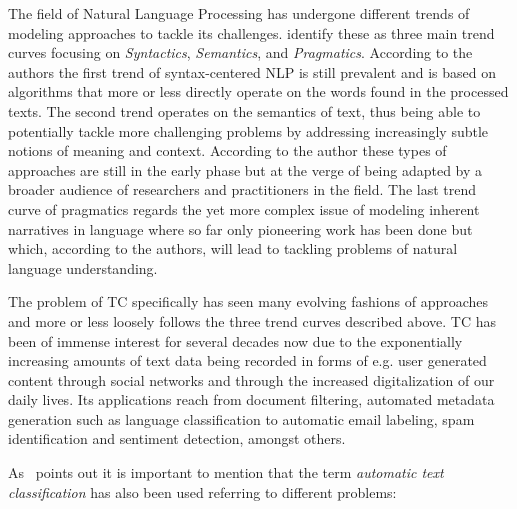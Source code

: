 The field of Natural Language Processing has undergone different trends of modeling approaches to tackle its challenges. \cite{Cambria:2014aa} identify these as three main trend curves focusing on \emph{Syntactics}, \emph{Semantics}, and \emph{Pragmatics}. According to the authors the first trend of syntax-centered NLP is still prevalent and is based on algorithms that more or less directly operate on the words found in the processed texts.
The second trend operates on the semantics of text, thus being able to potentially tackle more challenging problems by addressing increasingly subtle notions of meaning and context. According to the author these types of approaches are still in the early phase but at the verge of being adapted by a broader audience of researchers and practitioners in the field.
The last trend curve of pragmatics regards the yet more complex issue of modeling inherent narratives in language where so far only pioneering work has been done but which, according to the authors, will lead to tackling problems of natural language understanding.

The problem of \gls{TC} specifically has seen many evolving fashions of approaches and more or less loosely follows the three trend curves described above. \gls{TC} has been of immense interest for several decades now due to the exponentially increasing amounts of text data being recorded in forms of e.g. user generated content through social networks and through the increased digitalization of our daily lives. Its applications reach from document filtering, automated metadata generation such as language classification to automatic email labeling, spam identification and sentiment detection, amongst others.

As~\cite{Sebastiani:2002aa} points out it is important to mention that the term \emph{automatic text classification} has also been used referring to different problems: ~\cite{Sebastiani:2002aa}

